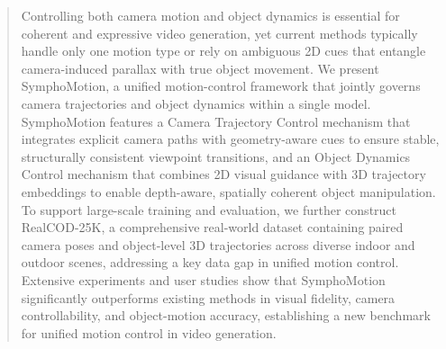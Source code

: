 \begin{abstract}
Controlling both camera motion and object dynamics is essential for coherent and expressive video generation, yet current methods typically handle only one motion type or rely on ambiguous 2D cues that entangle camera-induced parallax with true object movement. We present SymphoMotion, a unified motion-control framework that jointly governs camera trajectories and object dynamics within a single model. SymphoMotion features a Camera Trajectory Control mechanism that integrates explicit camera paths with geometry-aware cues to ensure stable, structurally consistent viewpoint transitions, and an Object Dynamics Control mechanism that combines 2D visual guidance with 3D trajectory embeddings to enable depth-aware, spatially coherent object manipulation. To support large-scale training and evaluation, we further construct RealCOD-25K, a comprehensive real-world dataset containing paired camera poses and object-level 3D trajectories across diverse indoor and outdoor scenes, addressing a key data gap in unified motion control. Extensive experiments and user studies show that SymphoMotion significantly outperforms existing methods in visual fidelity, camera controllability, and object-motion accuracy, establishing a new benchmark for unified motion control in video generation.

\end{abstract}

